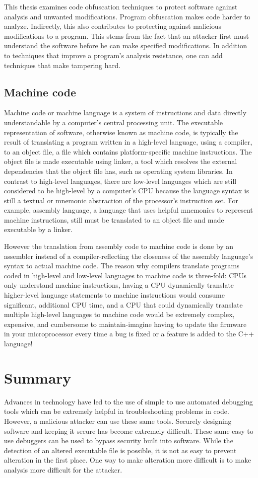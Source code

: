 \documentclass[a4paper,12pt]{article}
\begin{document}
This thesis examines code obfuscation techniques to protect software against
analysis and unwanted modifications. Program obfuscation makes code harder
to analyze. Indirectly, this also contributes to protecting against malicious
modifications to a program. This stems from the fact that an attacker first
must understand the software before he can make specified modifications. In
addition to techniques that improve a program’s analysis resistance, one can
add techniques that make tampering hard.

\subsection{Machine code}
Machine code or machine language is a system of instructions and data directly
understandable by a computer's central processing unit.
The executable representation of software, otherwise known as machine code,
is typically the result of translating a program written in a high-level
language, using a compiler, to an object file, a file which contains
platform-specific machine instructions. The object file is made executable
using linker, a tool which resolves the external dependencies that the object
file has, such as operating system libraries. In contrast to high-level
languages, there are low-level languages which are still considered to be
high-level by a computer's CPU because the language syntax is still a textual
or mnemonic abstraction of the processor's instruction set. For example,
assembly language, a language that uses helpful mnemonics to represent
machine instructions, still must be translated to an object file and made
executable by a linker.

However the translation from assembly code to machine
code is done by an assembler instead of a compiler-reflecting the closeness
of the assembly language's syntax to actual machine code. The reason why
compilers translate programs coded in high-level and low-level languages to
machine code is three-fold: CPUs only understand machine instructions, having
a CPU dynamically translate higher-level language statements to machine
instructions would consume significant, additional CPU time, and a CPU
that could dynamically translate multiple high-level languages to machine
code would be extremely complex, expensive, and cumbersome to
maintain-imagine having to update the firmware in your microprocessor every
time a bug is fixed or a feature is added to the C++ language! 

\section{Summary}
Advances in technology have led to the use of simple to use automated
debugging tools which can be extremely helpful in troubleshooting problems in
code. However, a malicious attacker can use these same tools. Securely
designing software and keeping it secure has become extremely difficult. 
These same easy to use debuggers can be used to bypass security built into
software. While the detection of an altered executable file is possible, it
is not as easy to prevent alteration in the first place. One way to make
alteration more difficult is to make analysis more difficult for the attacker.
\end{document}
